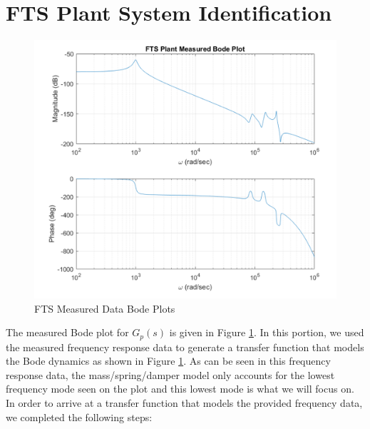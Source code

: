 \documentclass[a4paper, titlepage, 12pt]{article}
\begin{document}
	\section{FTS Plant System Identification}
		\begin{figure}
			\centering
			\includegraphics[width=\linewidth]{images/fts_measured_bode.PNG}
			\caption{FTS Measured Data Bode Plots}
			\label{fts_measured_bode}
		\end{figure}
		The measured Bode plot for $G_p(s)$ is given in Figure \ref{fts_measured_bode}.
		In this portion, we used the measured frequency response data to generate a
		transfer function that models the Bode dynamics as shown in Figure \ref{fts_measured_bode}.
		As can be seen in this frequency response data, the mass/spring/damper model
		only accounts for the lowest frequency mode seen on the plot and this lowest mode
		is what we will focus on. In order to arrive at a transfer function that models
		the provided frequency data, we completed the following steps:
\end{document}
